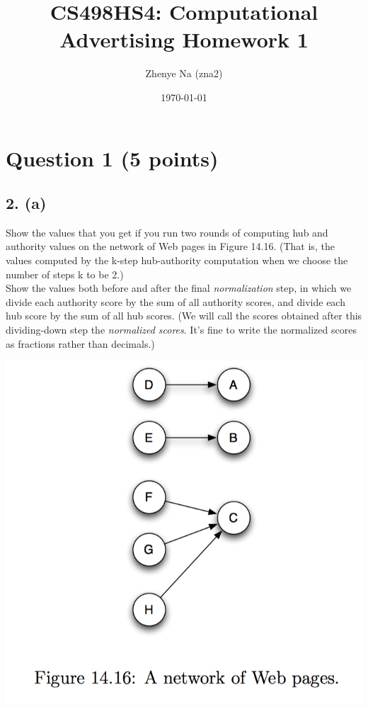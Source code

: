 \documentclass[a4paper]{article}
\title{CS498HS4: Computational Advertising Homework 1}
\author{Zhenye Na (zna2)}
\date{\today}
\begin{document}
\maketitle


\section{Question 1 (5 points)}

\subsection{2. (a)}

Show the values that you get if you run two rounds of computing hub and authority values on the network of Web pages in Figure 14.16. (That is, the values computed by the k-step hub-authority computation when we choose the number of steps k to be 2.)\\
Show the values both before and after the final \textit{normalization} step, in which we divide each authority score by the sum of all authority scores, and divide each hub score by the sum of all hub scores. (We will call the scores obtained after this dividing-down step the \textit{normalized scores}. It’s fine to write the normalized scores as fractions rather than decimals.)

\begin{center}
  \includegraphics[scale=0.5]{fig1.png}
\end{center}
\end{document}

